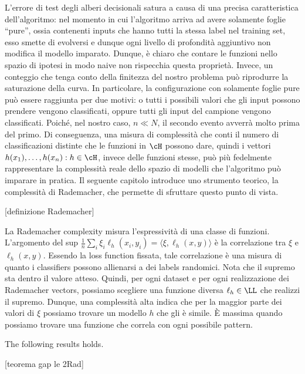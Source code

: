 L'errore di test degli alberi decisionali satura a causa di una precisa caratteristica dell'algoritmo: nel momento in cui l'algoritmo arriva ad avere solamente foglie ``pure'', ossia contenenti inputs che hanno tutti la stessa label nel training set, esso smette di evolversi e dunque ogni livello di profondità aggiuntivo non modifica il modello imparato. Dunque, è chiaro che contare le funzioni nello spazio di ipotesi in modo naive non rispecchia questa proprietà. Invece, un conteggio che tenga conto della finitezza del nostro problema può riprodurre la saturazione della curva. In particolare, la configurazione con solamente foglie pure può essere raggiunta per due motivi: o tutti i possibili valori che gli input possono prendere vengono classificati, oppure tutti gli input del campione vengono classificati. Poiché, nel nostro caso, $n \ll N$, il secondo evento avverrà molto prima del primo. Di conseguenza, una misura di complessità che conti il numero di classificazioni distinte che le funzioni in $\cH$ possono dare, quindi i vettori $h(x_1),\ldots,h(x_n) : h\in \cH$, invece delle funzioni stesse, può più fedelmente rappresentare la complessità reale dello spazio di modelli che l'algoritmo può imparare in pratica. Il seguente capitolo introduce uno strumento teorico, la complessità di Rademacher, che permette di sfruttare questo punto di vista. 

[definizione Rademacher]

La Rademacher complexity misura l'espressività di una classe di funzioni. L'argomento del sup $\frac{1}{n}\sum_i\xi_i \ell_h(x_i,y_i) = \langle \xi, \ell_h(x,y)\rangle$ è la correlazione tra $\xi$ e $\ell_h(x,y)$. 
Essendo la loss function fissata, tale correlazione è una misura di quanto i classifiers possono allienarsi a dei labels randomici. 
Nota che il supremo sta dentro il valore atteso. Quindi, per ogni dataset e per ogni realizzazione dei Rademacher vectors, possiamo scegliere una funzione diversa $\ell_h \in\LL$ che realizzi il supremo. Dunque, una complessità alta indica che per la maggior parte dei valori di $\xi$ possiamo trovare un modello $h$ che gli è simile. \`E  massima  quando possiamo trovare una funzione che correla con ogni possibile pattern. 

The following results holds.

[teorema gap le 2Rad]

